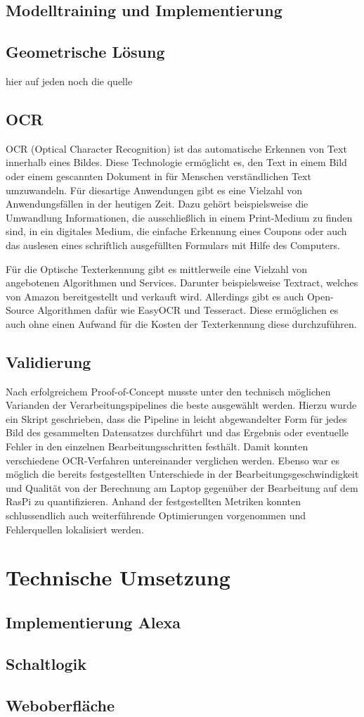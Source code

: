 \section{Modelltraining und Implementierung}

\section{Geometrische Lösung}
hier auf jeden noch die quelle 

\section{OCR}
OCR (Optical Character Recognition) ist das automatische Erkennen von Text innerhalb eines Bildes. Diese Technologie ermöglicht es, den Text in einem Bild oder einem gescannten Dokument in für Menschen verständlichen Text umzuwandeln. Für diesartige Anwendungen gibt es eine Vielzahl von Anwendungsfällen in der heutigen Zeit. Dazu gehört beispielsweise die Umwandlung Informationen, die ausschließlich in einem Print-Medium zu finden sind, in ein digitales Medium, die einfache Erkennung eines Coupons oder auch das auslesen eines schriftlich ausgefüllten Formulars mit Hilfe des Computers.\autocite[Vgl.][S. 81]{ocr1}

Für die Optische Texterkennung gibt es mittlerweile eine Vielzahl von angebotenen Algorithmen und Services. Darunter beispielsweise Textract, welches von Amazon bereitgestellt und verkauft wird. Allerdings gibt es auch Open-Source Algorithmen dafür wie EasyOCR und Tesseract. Diese ermöglichen es auch ohne einen Aufwand für die Kosten der Texterkennung diese durchzuführen.

\section{Validierung}
Nach erfolgreichem Proof-of-Concept musste unter den technisch möglichen Varianden der Verarbeitungspipelines die beste ausgewählt werden. Hierzu wurde ein Skript geschrieben, dass die Pipeline in leicht abgewandelter Form für jedes Bild des gesammelten Datensatzes durchführt und das Ergebnis oder eventuelle Fehler in den einzelnen Bearbeitungsschritten festhält. Damit konnten verschiedene OCR-Verfahren untereinander verglichen werden. Ebenso war es möglich die bereits festgestellten Unterschiede in der Bearbeitungsgeschwindigkeit und Qualität von der Berechnung am Laptop gegenüber der Bearbeitung auf dem RasPi zu quantifizieren. Anhand der festgestellten Metriken konnten schlussendlich auch weiterführende Optimierungen vorgenommen und Fehlerquellen lokalisiert werden.


\chapter{Technische Umsetzung}

\section{Implementierung Alexa}
\section{Schaltlogik}
\section{Weboberfläche}


